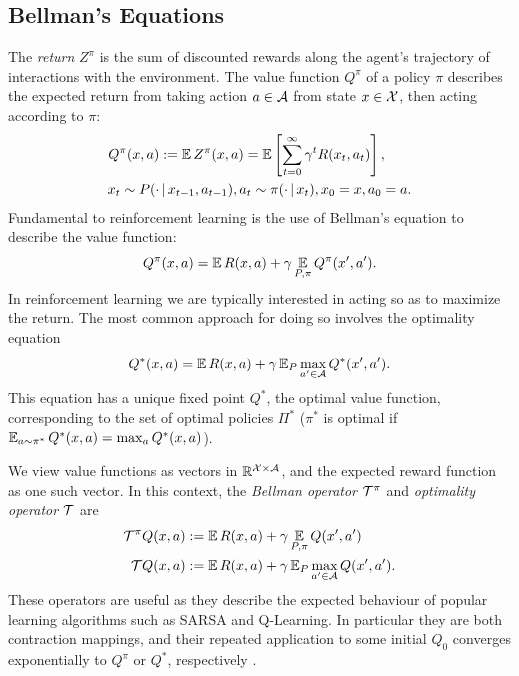 \documentclass{article}
\begin{document}
\subsection{Bellman's Equations}

The \emph{return} $Z^\pi$ is the sum of discounted rewards along the agent's trajectory of interactions with the environment. The value function $Q^\pi$ of a policy $\pi$ describes the expected return from taking action $a \in \mathcal{A}$ from state $x \in \mathcal{X}$, then acting according to $\pi$:
\begin{align}
Q^\pi(x,a) &:= \expect Z^\pi(x,a) = \expect \left [ \sum_{t=0}^\infty \gamma^t R(x_t, a_t) \right ], \label{eqn:random_return} \\
x_t \sim P(\cdot &\cbar x_{t-1}, a_{t-1}), a_t \sim \pi(\cdot \cbar x_t), x_0 = x, a_0 = a . \nonumber
\end{align}
Fundamental to reinforcement learning is the use of Bellman's equation  \citep{bellman57dynamic} to describe the value function:
\begin{equation*}
Q^\pi(x,a) = \expect R(x,a) + \gamma \expect_{P, \pi} Q^\pi(x', a') .
\end{equation*}
In reinforcement learning we are typically interested in acting so as to maximize the return. The most common approach for doing so involves the optimality equation
\begin{equation*}
Q^*(x,a) = \expect R(x,a) + \gamma \expect\nolimits_P \max_{a' \in \cA} Q^*(x', a') .
\end{equation*}
This equation has a unique fixed point $Q^*$, the optimal value function, corresponding to the set of optimal policies $\Pi^*$ ($\pi^*$ is optimal if $\expect_{a \sim \pi^*} Q^*(x, a) = \max_a Q^*(x,a)$).

We view value functions as vectors in $\mathbb{R}^{\mathcal{X} \times \mathcal{A}}$, and the expected reward function as one such vector. In this context, the \emph{Bellman operator} $\mathcal{T}^\pi$ and \emph{optimality operator} $\mathcal{T}$ are
\begin{align}
\cT^\pi Q(x,a) &:= \expect R(x,a) + \gamma \expect_{P, \pi} Q(x',a')\label{eqn:bellman_operator_pe} \\
\cT Q(x,a) &:= \expect R(x,a) + \gamma \expects_{P} \max_{a' \in \cA} Q(x', a') . \label{eqn:bellman_operator_optimality}
\end{align}
These operators are useful as they describe the expected behaviour of popular learning algorithms such as SARSA and Q-Learning. In particular they are both contraction mappings, and their repeated application to some initial $Q_0$ converges exponentially to $Q^\pi$ or $Q^*$, respectively \citep{bertsekas96neurodynamic}.
\end{document}
